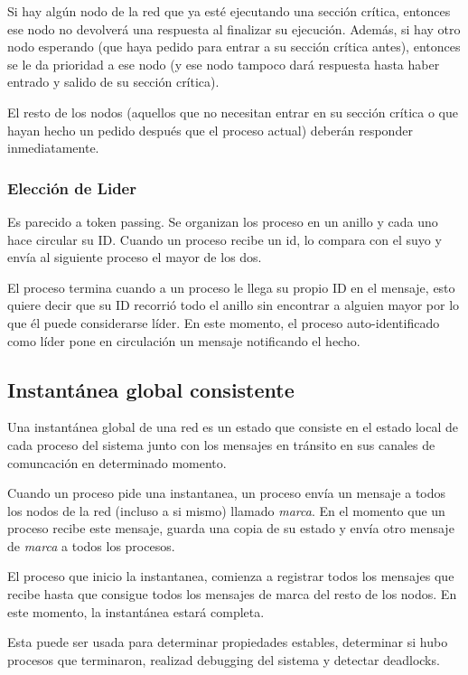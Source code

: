 Si hay algún nodo de la red que ya esté ejecutando una sección crítica, entonces ese nodo no devolverá una respuesta al finalizar su ejecución. Además, si hay otro nodo esperando (que haya pedido para entrar a su sección crítica antes), entonces se le da prioridad a ese nodo (y ese nodo tampoco dará respuesta hasta haber entrado y salido de su sección crítica).

El resto de los nodos (aquellos que no necesitan entrar en su sección crítica o que hayan hecho un pedido después que el proceso actual) deberán responder inmediatamente.

\subsubsection{Elección de Lider}
Es parecido a token passing. Se organizan los proceso en un anillo y cada uno hace circular su ID. Cuando un proceso recibe un id, lo compara con el suyo y envía al siguiente proceso el mayor de los dos.

El proceso termina cuando a un proceso le llega su propio ID en el mensaje, esto quiere decir que su ID recorrió todo el anillo sin encontrar a alguien mayor por lo que  él puede considerarse líder. En este momento, el proceso auto-identificado como líder pone en circulación un mensaje notificando el hecho.

\subsection{Instantánea global consistente}
Una instantánea global de una red es un estado que consiste en el estado local de cada proceso del sistema junto con los mensajes en tránsito en sus canales de comuncación en determinado momento. 

Cuando un proceso pide una instantanea, un proceso envía un mensaje a todos los nodos de la red (incluso a si mismo) llamado \textit{marca}. En el momento que un proceso recibe este mensaje, guarda una copia de su estado y envía otro mensaje de \textit{marca} a todos los procesos.

El proceso que inicio la instantanea, comienza a registrar todos los mensajes que recibe hasta que consigue todos los mensajes de marca del resto de los nodos. En este momento, la instantánea estará completa.

Esta puede ser usada para determinar propiedades estables, determinar si hubo procesos que terminaron, realizad debugging del sistema y detectar deadlocks.

